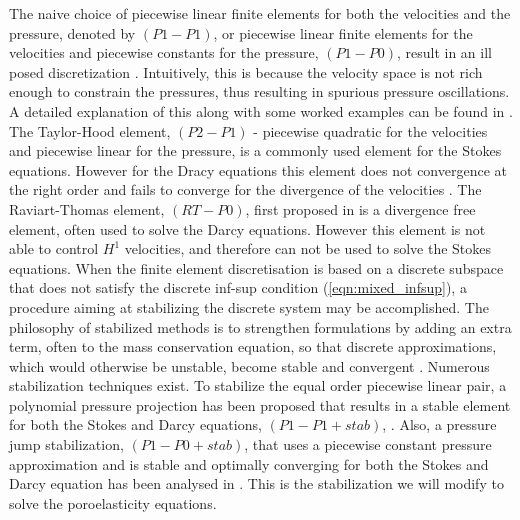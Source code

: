 %
The naive choice of piecewise linear finite elements for both the velocities and the pressure, denoted by $(P1-P1)$, or piecewise linear finite elements for the velocities and piecewise constants for the pressure, $(P1-P0)$, result in an ill posed discretization \citep{burman2007unified}. Intuitively, this is because the velocity space is not rich enough to constrain the pressures, thus resulting in spurious pressure oscillations. A detailed explanation of this along with some worked examples can be found in \citet{elman2005finite}. The Taylor-Hood element, $(P2-P1)$ - piecewise quadratic for the velocities and piecewise linear for the pressure, is a commonly used element for the Stokes equations. However for the Dracy equations this element does not convergence at the right order and fails to converge for the divergence of the velocities
\citep{burman2007unified}. The Raviart-Thomas element, $(RT-P0)$, first proposed in \citet{raviart1977mixed} is a divergence free element, often used to solve the Darcy equations. 
However this element is not able to control $H^{1}$ velocities, and therefore can not be used to solve the Stokes equations.  
%
%
%
When the finite element discretisation is based on a discrete subspace that does not satisfy the discrete inf-sup condition (\ref{eqn:mixed_infsup}), a procedure aiming at stabilizing the discrete system may be accomplished. The philosophy of stabilized methods is to
strengthen formulations by adding an extra term, often to the mass conservation equation, so that discrete approximations, which would otherwise be
unstable, become stable and convergent \citep{masud2002stabilized}. 
%
Numerous stabilization techniques exist. To stabilize the equal order piecewise linear pair, a  polynomial pressure projection has been proposed that results in a stable element for both the Stokes and Darcy equations, $(P1-P1+stab)$, \citet{bochev2006computational}. Also, a pressure jump stabilization, $(P1-P0+stab)$, that uses a  piecewise constant pressure approximation and is stable and optimally converging for both the Stokes and Darcy equation has been analysed in \citet{burman2007unified}. This is the stabilization we will modify to solve the poroelasticity equations.


